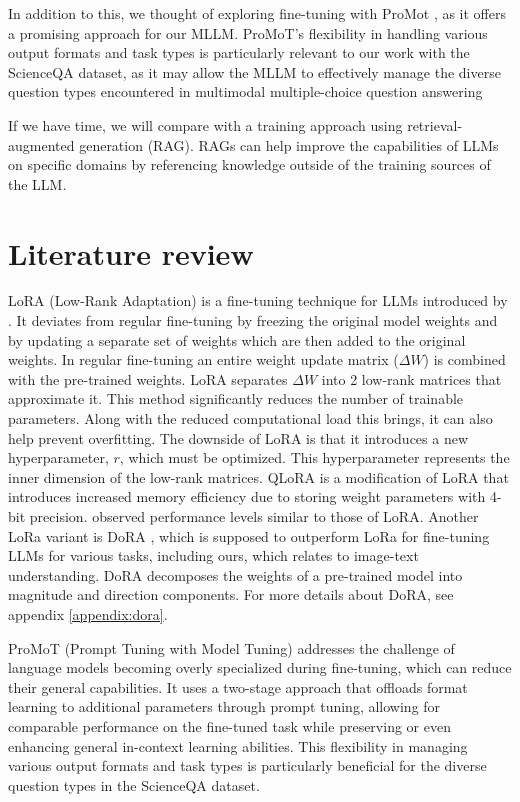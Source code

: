 \documentclass[11pt]{article} %
\begin{document}
In addition to this, we thought of exploring fine-tuning with ProMot \cite{valizadehaslani2022twostagefinetuningnovelstrategy}, as it offers a promising approach for our MLLM. ProMoT's flexibility in handling various output formats and task types is particularly relevant to our work with the ScienceQA dataset, as it may allow the MLLM to effectively manage the diverse question types encountered in multimodal multiple-choice question answering

If we have time, we will compare with a training approach using retrieval-augmented generation (RAG). RAGs can help improve the capabilities of LLMs on specific domains by referencing knowledge outside of the training sources of the LLM.

\section*{Literature review} 
LoRA (Low-Rank Adaptation) is a fine-tuning technique for LLMs introduced by \cite{lora}. It deviates from regular fine-tuning by freezing the original model weights and by updating a separate set of weights which are then added to the original weights. In regular fine-tuning an entire weight update matrix ($\Delta W$) is combined with the pre-trained weights. LoRA separates $\Delta W$ into 2 low-rank matrices that approximate it. This method significantly reduces the number of trainable parameters. Along with the reduced computational load this brings, it can also help prevent overfitting. The downside of LoRA is that it introduces a new hyperparameter, $r$, which must be optimized. This hyperparameter represents the inner dimension of the low-rank matrices. QLoRA \cite{qlora} is a modification of LoRA that introduces increased memory efficiency due to storing weight parameters with 4-bit precision. \cite{qlora} observed performance levels similar to those of LoRA.
Another LoRa variant is DoRA \cite{dora}, which is supposed to outperform LoRa for fine-tuning LLMs for various tasks, including ours, which relates to image-text understanding. DoRA decomposes the weights of a pre-trained model into magnitude and direction components. For more details about DoRA, see appendix \ref{appendix:dora}.

ProMoT (Prompt Tuning with Model Tuning) \cite{valizadehaslani2022twostagefinetuningnovelstrategy} addresses the challenge of language models becoming overly specialized during fine-tuning, which can reduce their general capabilities. It uses a two-stage approach that offloads format learning to additional parameters through prompt tuning, allowing for comparable performance on the fine-tuned task while preserving or even enhancing general in-context learning abilities. This flexibility in managing various output formats and task types is particularly beneficial for the diverse question types in the ScienceQA dataset.
\end{document}
